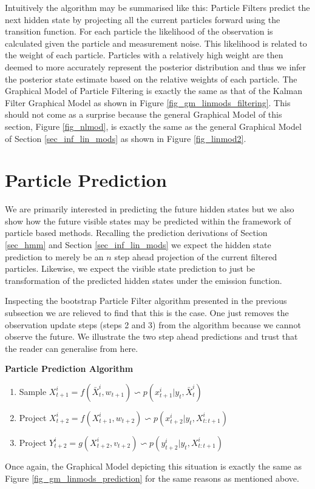 Intuitively the algorithm may be summarised like this: Particle Filters predict the next hidden state by projecting all the current particles forward using the transition function. For each particle the likelihood of the observation is calculated given the particle and measurement noise. This likelihood is related to the weight of each particle. Particles with a relatively high weight are then deemed to more accurately represent the posterior distribution and thus we infer the posterior state estimate based on the relative weights of each particle. The Graphical Model of Particle Filtering is exactly the same as that of the Kalman Filter Graphical Model as shown in Figure \ref{fig_gm_linmods_filtering}. This should not come as a surprise because the general Graphical Model of this section, Figure \ref{fig_nlmod}, is exactly the same as the general Graphical Model of Section \ref{sec_inf_lin_mods} as shown in Figure \ref{fig_linmod2}. 

\section{Particle Prediction}
\label{sec_particle_prediction}
We are primarily interested in predicting the future hidden states but we also show how the future visible states may be predicted within the framework of particle based methods. Recalling the prediction derivations of Section \ref{sec_hmm} and Section \ref{sec_inf_lin_mods} we expect the hidden state prediction to merely be an $n$ step ahead projection of the current filtered particles. Likewise, we expect the visible state prediction to just be transformation of the predicted hidden states under the emission function. 

Inspecting the bootstrap Particle Filter algorithm presented in the previous subsection we are relieved to find that this is the case. One just removes the observation update steps (steps 2 and 3) from the algorithm because we cannot observe the future. We illustrate the two step ahead predictions and trust that the reader can generalise from here.

\textbf{Particle Prediction Algorithm}
\begin{enumerate}
\item
Sample $X_{t+1}^i = f(\bar{X}_t^i, w_{t+1}) \backsim p(x_{t+1}^i|y_t, \bar{X}_t^i)$ 
\item
Project $X_{t+2}^i = f(X_{t+1}^i, w_{t+2}) \backsim p(x_{t+2}^i|y_t, X_{t:t+1}^i)$ 
\item
Project $Y_{t+2}^i = g(X_{t+2}^i, v_{t+2}) \backsim p(y_{t+2}^i|y_t, X_{t:t+1}^i)$ 
\end{enumerate}
Once again, the Graphical Model depicting this situation is exactly the same as Figure \ref{fig_gm_linmods_prediction} for the same reasons as mentioned above.

